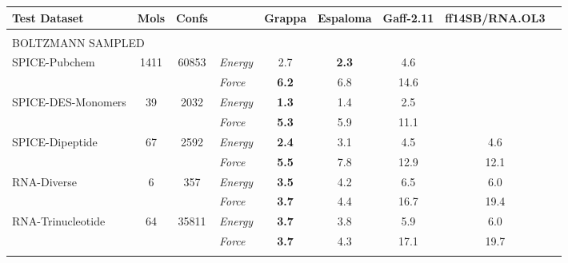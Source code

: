 \documentclass[varwidth]{standalone}
\newcommand{\widthbetweentype}{7pt}
\begin{document}
\begin{adjustbox}{width=\textwidth,center}
\centering

\renewcommand{\arraystretch}{1.0} %

\begin{tabular}{l c c l c c c c c}

\hline
\hline
Test Dataset & Mols & Confs & & Grappa & Espaloma & Gaff-2.11 & ff14SB/RNA.OL3 \\
\hline
\multicolumn{8}{l}{\vspace{\widthbetweentype}} \\[-1em]
\multicolumn{8}{l}{\small{BOLTZMANN SAMPLED}} \\\hline
\multirow{2}{*}{SPICE-Pubchem} & \multirow{2}{*}{1411} & \multirow{2}{*}{60853} & \textit{Energy} & 2.7 & \textbf{2.3} & 4.6 & \\
                                   &                       &                         & \textit{Force}  & \textbf{6.2} & 6.8 & 14.6 & \\
\hline
\multirow{2}{*}{SPICE-DES-Monomers} & \multirow{2}{*}{39} & \multirow{2}{*}{2032} & \textit{Energy} & \textbf{1.3} & 1.4 & 2.5 & \\
                                   &                       &                         & \textit{Force}  & \textbf{5.3} & 5.9 & 11.1 & \\
\hline
\multirow{2}{*}{SPICE-Dipeptide} & \multirow{2}{*}{67} & \multirow{2}{*}{2592} & \textit{Energy} & \textbf{2.4} & 3.1 & 4.5 & 4.6\\
                                   &                       &                         & \textit{Force}  & \textbf{5.5} & 7.8 & 12.9 & 12.1\\
\hline
\multirow{2}{*}{RNA-Diverse} & \multirow{2}{*}{6} & \multirow{2}{*}{357} & \textit{Energy} & \textbf{3.5} & 4.2 & 6.5 & 6.0\\
                                   &                       &                         & \textit{Force}  & \textbf{3.7} & 4.4 & 16.7 & 19.4\\
\hline
\multirow{2}{*}{RNA-Trinucleotide} & \multirow{2}{*}{64} & \multirow{2}{*}{35811} & \textit{Energy} & \textbf{3.7} & 3.8 & 5.9 & 6.0\\
                                   &                       &                         & \textit{Force}  & \textbf{3.7} & 4.3 & 17.1 & 19.7\\
\hline
\multicolumn{8}{l}{\vspace{\widthbetweentype}} \\[-1em]

\end{tabular}
\end{adjustbox}
\end{document}
